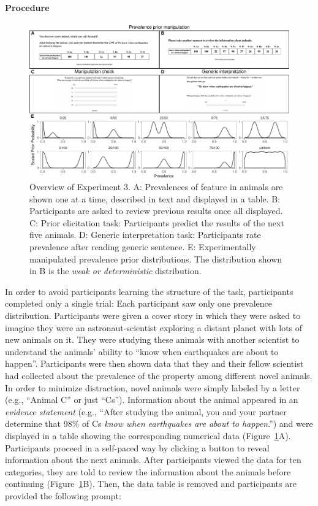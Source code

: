 \documentclass[floatsintext,doc]{apa6}
\theoremstyle{definition}
\theoremstyle{definition}
\theoremstyle{definition}
\theoremstyle{remark}
\begin{document}
\paragraph{Procedure}\label{procedure}

\begin{figure}
\centering
\includegraphics{genint_files/figure-latex/priorManipulationExpt-1.pdf}
\caption{\label{fig:priorManipulationExpt}Overview of Experiment 3. A:
Prevalences of feature in animals are shown one at a time, described in
text and displayed in a table. B: Participants are asked to review
previous results once all displayed. C: Prior elicitation task:
Participants predict the results of the next five animals. D: Generic
interpretation task: Participants rate prevalence after reading generic
sentence. E: Experimentally manipulated prevalence prior distributions.
The distribution shown in B is the \emph{weak or deterministic}
distribution.}
\end{figure}

In order to avoid participants learning the structure of the task,
participants completed only a single trial: Each participant saw only
one prevalence distribution. Participants were given a cover story in
which they were asked to imagine they were an astronaut-scientist
exploring a distant planet with lots of new animals on it. They were
studying these animals with another scientist to understand the animals'
ability to \enquote{know when earthquakes are about to happen}.
Participants were then shown data that they and their fellow scientist
had collected about the prevalence of the property among different novel
animals. In order to minimize distraction, novel animals were simply
labeled by a letter (e.g., \enquote{Animal C} or just \enquote{Cs}).
Information about the animal appeared in an \emph{evidence statement}
(e.g., \enquote{After studying the animal, you and your partner
determine that 98\% of Cs \emph{know when earthquakes are about to
happen}.}) and were displayed in a table showing the corresponding
numerical data (Figure~\ref{fig:priorManipulationExpt}A). Participants
proceed in a self-paced way by clicking a button to reveal information
about the next animals. After participants viewed the data for ten
categories, they are told to review the information about the animals
before continuing (Figure~\ref{fig:priorManipulationExpt}B). Then, the
data table is removed and participants are provided the following
prompt:
\end{document}
